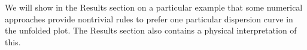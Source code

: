 We will show in the Results section on a particular example that some numerical approaches provide nontrivial rules to prefer one particular dispersion curve in the unfolded plot. The Results section also contains a physical interpretation of this.

% 

